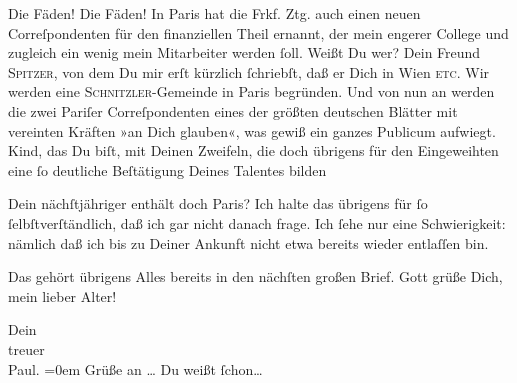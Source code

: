 \pstart
           Die Fäden! Die Fäden! In Paris hat die Frkf. Ztg. auch {\pb}einen neuen Correſpondenten für den finanziellen Theil ernannt, der mein engerer College\strikeout{\textcolor{gray}{w}} und zugleich ein wenig mein Mitarbeiter werden ſoll. Weißt Du wer? Dein Freund \textsc{Spitzer}, von dem Du mir erſt kürzlich ſchriebſt, daß er Dich in Wien\label{K_L02671-2v}\label{K_L02671-2}{ }\textsc{etc}. Wir werden eine \textsc{Schnitzler}-Gemeinde in \strikeout{\textcolor{gray}{Wi}}{ }Paris begründen. Und von nun an werden die zwei
                  Pariſer Correſpondenten eines der größten deutschen Blätter mit vereinten Kräften »an Dich glauben«, was gewiß ein ganzes Publicum
               aufwiegt. Kind, das Du biſt, mit Deinen Zweifeln, die doch übrigens für den
               Eingeweihten eine ſo deutliche Beſtätigung Deines Talentes bilden{\dotsfour}\pend
           
\pstart
           {\pb}Dein nächſtjähriger \label{K_L02671-3v}\label{K_L02671-3} enthält doch Paris? Ich
               halte das übrigens für ſo ſelbſtverſtändlich, daß ich gar nicht danach frage. Ich
               ſehe nur eine Schwierigkeit: nämlich daß ich bis zu Deiner Ankunft nicht etwa bereits
               wieder entlaſſen bin.\pend
           
\pstart
           Das gehört übrigens Alles bereits in den nächſten großen Brief. Gott grüße Dich, mein
               lieber Alter!\pend
           
\pstart
           Dein {\\[\baselineskip]}treuer {\\[\baselineskip]}\spacefill\mbox{Paul.}\pend
           \leftskip=0em{}
\pstart
           \noindent{}Grüße an {\dots}{ } Du weißt ſchon{\dots}\pend
           \endnumbering{}  
      